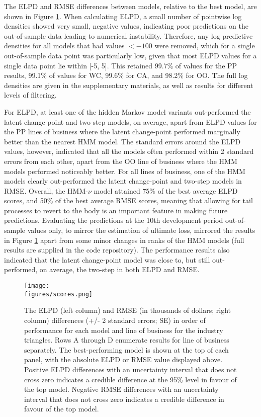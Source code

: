 The ELPD and RMSE differences between models, relative to
the best model,
are shown in Figure \ref{fig:backtest-scores}.
When calculating ELPD, a small number of pointwise log densities 
showed very small, negative values, indicating poor predictions
on the out-of-sample data leading to numerical instability. 
Therefore, any log predictive
densities for all models that had values $< -100$ were removed, which for a single
out-of-sample data point was particularly low, given that most
ELPD values for a single data point lie within [-5, 5]. This retained 99.7\%
of values for the PP results, 99.1\% of values for WC, 99.6\%
for CA, and 98.2\% for OO. The full log densities are given in the
supplementary materials, as well as results for different levels
of filtering.

For ELPD, at least one of the
hidden Markov model variants out-performed
the latent change-point and 
two-step models, on average, 
apart from ELPD values for the PP
lines of business where the latent change-point
performed marginally better than the nearest
HMM model. The standard errors around the ELPD
values, however, indicated that all the models
often performed within 2 standard errors from each other,
apart from the OO line of business where the HMM models
performed noticeably better.
For all lines of business, one of the HMM 
models clearly out-performed the latent change-point
and two-step models in RMSE.
Overall, the HMM-$\nu$ model attained
75\% of the best average ELPD scores, and 50\%
of the best average RMSE scores, meaning that
allowing for tail processes to revert
to the body is an important feature in making
future predictions.
Evaluating the predictions at the 10th
development period
out-of-sample values only, to mirror
the estimation of ultimate loss,
mirrored the results in Figure
\ref{fig:backtest-scores} apart from some
minor changes in ranks of the HMM
models (full results are supplied
in the code repository).
The performance results also indicated
that the latent change-point model
was close to, but still out-performed,
on average, the two-step in both ELPD and RMSE.


\begin{figure}
    \centering
    \texttt{[image: \\figures/scores.png]}
    \caption{
        The ELPD (left column) and RMSE (in thousands of dollars; right column)
		differences (+/- 2 standard errors; SE) in order of performance
        for each model and line of business for the industry
        triangles. Rows A through D enumerate results
        for line of business separately.
        The best-performing model is shown at the top of each
        panel, with the absolute ELPD or RMSE value displayed above.
        Positive ELPD differences with an uncertainty interval that does not
        cross zero indicates a credible difference at the 95\% level
        in favour of the top model.
        Negative RMSE differences with an uncertainty interval
        that does not cross zero indicates a credible difference
        in favour of the top model.
    }
	\label{fig:backtest-scores}
\end{figure}

